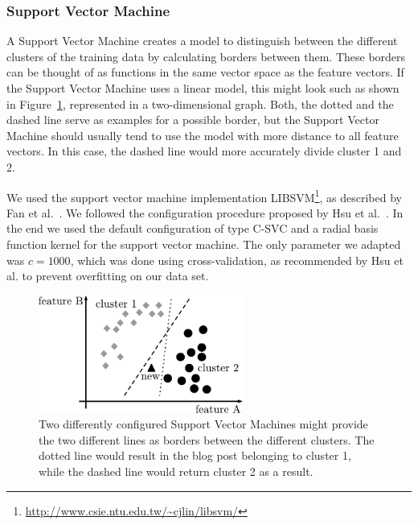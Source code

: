 \subsubsection{Support Vector Machine}
\label{sec:support_vector_machine}


A Support Vector Machine creates a model to distinguish between the different clusters of the training data by calculating borders between them.
These borders can be thought of as functions in the same vector space as the feature vectors.
If the Support Vector Machine uses a linear model, this might look such as shown in Figure~\ref{fig:svm}, represented in a two-dimensional graph.
Both, the dotted and the dashed line serve as examples for a possible border, but the Support Vector Machine should usually tend to use the model with more distance to all feature vectors.
In this case, the dashed line would more accurately divide cluster 1 and 2.


We used the support vector machine implementation LIBSVM\footnote{\url{http://www.csie.ntu.edu.tw/~cjlin/libsvm/}}, as described by Fan et al.~\cite{fan2005working}.
We followed the configuration procedure proposed by Hsu et al.~\cite{hsu2003practical}.
In the end we used the default configuration of type C-SVC and a radial basis function kernel for the support vector machine.
The only parameter we adapted was $c=1000$, which was done using cross-validation, as recommended by Hsu et al. to prevent overfitting on our data set.


\begin{figure}[h]
    \centering
    \includegraphics[width=0.6\textwidth]{images/svm.pdf}
    \caption{Two differently configured Support Vector Machines might provide the two different lines as borders between the different clusters. The dotted line would result in the blog post belonging to cluster 1, while the dashed line would return cluster 2 as a result.}
    \label{fig:svm}
\end{figure}
